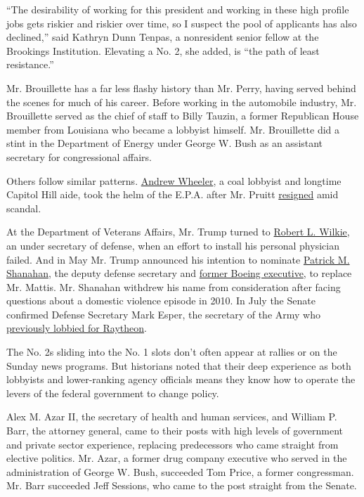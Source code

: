 ``The desirability of working for this president and working in these
high profile jobs gets riskier and riskier over time, so I suspect the
pool of applicants has also declined,'' said Kathryn Dunn Tenpas, a
nonresident senior fellow at the Brookings Institution. Elevating a No.
2, she added, is ``the path of least resistance.''

Mr. Brouillette has a far less flashy history than Mr. Perry, having
served behind the scenes for much of his career. Before working in the
automobile industry, Mr. Brouillette served as the chief of staff to
Billy Tauzin, a former Republican House member from Louisiana who became
a lobbyist himself. Mr. Brouillette did a stint in the Department of
Energy under George W. Bush as an assistant secretary for congressional
affairs.

Others follow similar patterns.
\href{https://www.nytimes.com/2019/02/28/climate/andrew-wheeler-epa-confirmation.html}{Andrew
Wheeler}, a coal lobbyist and longtime Capitol Hill aide, took the helm
of the E.P.A. after Mr. Pruitt
\href{https://www.nytimes.com/2018/07/05/climate/scott-pruitt-epa-trump.html}{resigned}
amid scandal.

At the Department of Veterans Affairs, Mr. Trump turned to
\href{https://www.nytimes.com/2018/07/23/us/politics/senate-confirms-robert-wilkie-veterans-affairs.html}{Robert
L. Wilkie}, an under secretary of defense, when an effort to install his
personal physician failed. And in May Mr. Trump announced his intention
to nominate
\href{https://www.nytimes.com/2019/05/09/us/politics/patrick-shanahan-defense-department.html}{Patrick
M. Shanahan}, the deputy defense secretary and
\href{https://www.nytimes.com/2019/04/25/us/politics/defense-shanahan-boeing-cleared.html}{former
Boeing executive}, to replace Mr. Mattis. Mr. Shanahan withdrew his name
from consideration after facing questions about a domestic violence
episode in 2010. In July the Senate confirmed Defense Secretary Mark
Esper, the secretary of the Army who
\href{https://www.nytimes.com/2019/04/25/us/politics/defense-shanahan-boeing-cleared.html}{previously
lobbied for Raytheon}.

The No. 2s sliding into the No. 1 slots don't often appear at rallies or
on the Sunday news programs. But historians noted that their deep
experience as both lobbyists and lower-ranking agency officials means
they know how to operate the levers of the federal government to change
policy.

Alex M. Azar II, the secretary of health and human services, and William
P. Barr, the attorney general, came to their posts with high levels of
government and private sector experience, replacing predecessors who
came straight from elective politics. Mr. Azar, a former drug company
executive who served in the administration of George W. Bush, succeeded
Tom Price, a former congressman. Mr. Barr succeeded Jeff Sessions, who
came to the post straight from the Senate.

